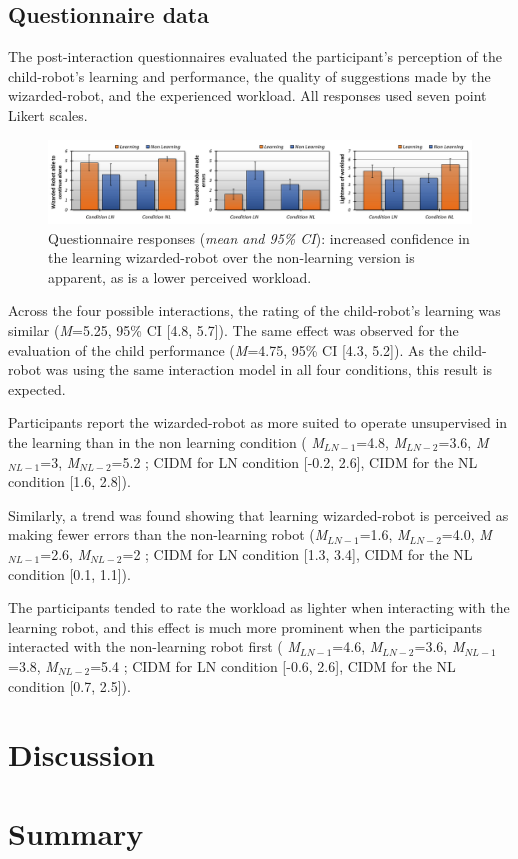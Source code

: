 \subsection{Questionnaire data}

The post-interaction questionnaires evaluated the participant's perception of the child-robot's learning and performance, the quality of suggestions made by the wizarded-robot, and the experienced workload. All responses used seven point Likert scales.

\begin{figure}[t!]
	\centering
	\includegraphics[width=1.0\textwidth]{./images/woz_graph_quest.png}
	\caption{Questionnaire responses (\textit{mean and 95\% CI}): increased confidence in the learning wizarded-robot over the non-learning version is apparent, as is a lower perceived workload.}
	\label{fig:questionnaires}
\end{figure}

Across the four possible interactions, the rating of the child-robot's learning was similar (\textit{M}=5.25, 95\% CI [4.8, 5.7]).
The same effect was observed for the evaluation of the child performance (\textit{M}=4.75, 95\% CI [4.3, 5.2]). As the child-robot was using the same interaction model in all four conditions, this result is expected.

Participants report the wizarded-robot as more suited to operate unsupervised in the learning than in the non learning condition (
\textit{M$_{LN-1}$}=4.8, %
\textit{M$_{LN-2}$}=3.6, %
\textit{M$_{NL-1}$}=3, %
\textit{M$_{NL-2}$}=5.2 %
; CIDM for LN condition [-0.2, 2.6], CIDM for the NL condition [1.6, 2.8]).

Similarly, a trend was found showing that learning wizarded-robot is perceived as making fewer errors than the non-learning robot (\textit{M$_{LN-1}$}=1.6, %
\textit{M$_{LN-2}$}=4.0, %
\textit{M$_{NL-1}$}=2.6, %
\textit{M$_{NL-2}$}=2 %
; CIDM for LN condition [1.3, 3.4], CIDM for the NL condition [0.1, 1.1]). 

The participants tended to rate the workload as lighter when interacting with the learning robot, and this effect is much more prominent when the participants interacted with the non-learning robot first (
\textit{M$_{LN-1}$}=4.6, %
\textit{M$_{LN-2}$}=3.6, %
\textit{M$_{NL-1}$}=3.8, %
\textit{M$_{NL-2}$}=5.4 %
; CIDM for LN condition [-0.6, 2.6], CIDM for the NL condition [0.7, 2.5]).


\section{Discussion}

\section{Summary}

